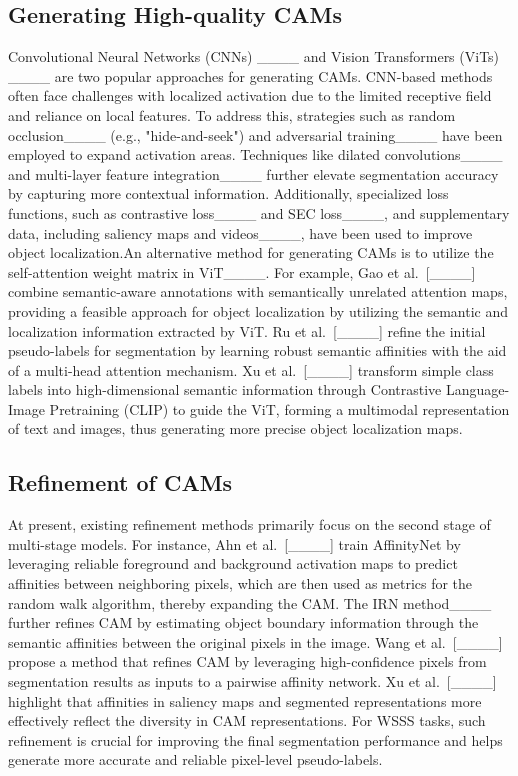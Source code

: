     
    
\subsection{Generating High-quality CAMs}

    Convolutional Neural Networks (CNNs) ____ and Vision Transformers (ViTs) ____ are two popular approaches for generating CAMs. CNN-based methods often face challenges with localized activation due to the limited receptive field and reliance on local features. To address this, strategies such as random occlusion____ (e.g., "hide-and-seek") and adversarial training____ have been employed to expand activation areas. Techniques like dilated convolutions____ and multi-layer feature integration____ further elevate segmentation accuracy by capturing more contextual information. Additionally, specialized loss functions, such as contrastive loss____ and SEC loss____, and supplementary data, including saliency maps and videos____, have been used to improve object localization.An alternative method for generating CAMs is to utilize the self-attention weight matrix in ViT____. For example, Gao et al.~[____] combine semantic-aware annotations with semantically unrelated attention maps, providing a feasible approach for object localization by utilizing the semantic and localization information extracted by ViT. Ru et al.~[____] refine the initial pseudo-labels for segmentation by learning robust semantic affinities with the aid of a multi-head attention mechanism. Xu et al.~[____] transform simple class labels into high-dimensional semantic information through Contrastive Language-Image Pretraining (CLIP) to guide the ViT, forming a multimodal representation of text and images, thus generating more precise object localization maps.
    
\subsection{Refinement of CAMs}

     At present, existing refinement methods primarily focus on the second stage of multi-stage models. For instance, Ahn et al.~[____] train AffinityNet by leveraging reliable foreground and background activation maps to predict affinities between neighboring pixels, which are then used as metrics for the random walk algorithm, thereby expanding the CAM. The IRN method____ further refines CAM by estimating object boundary information through the semantic affinities between the original pixels in the image. Wang et al.~[____] propose a method that refines CAM by leveraging high-confidence pixels from segmentation results as inputs to a pairwise affinity network. Xu et al.~[____] highlight that affinities in saliency maps and segmented representations more effectively reflect the diversity in CAM representations. For WSSS tasks, such refinement is crucial for improving the final segmentation performance and helps generate more accurate and reliable pixel-level pseudo-labels.